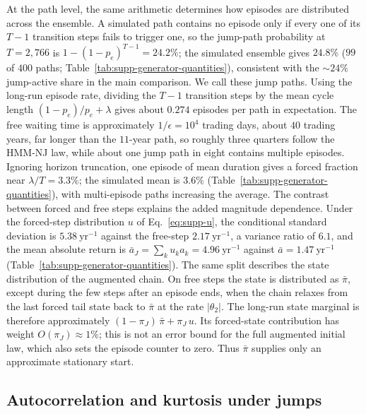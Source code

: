 At the path level, the same arithmetic determines how episodes are
distributed across the ensemble. A simulated path contains no episode
only if every one of its $T - 1$ transition steps fails to trigger
one, so the jump-path probability at $T = 2{,}766$ is
$1 - (1 - p_e)^{T-1} = 24.2\%$; the simulated ensemble
gives $24.8\%$ ($99$ of $400$ paths;
Table~\ref{tab:supp-generator-quantities}), consistent with the $\sim\!24\%$ jump-active share in the main comparison. We call these jump paths. Using the long-run episode rate, dividing the $T - 1$ transition
steps by the mean cycle length $(1 - p_e)/p_e + \lambda$ gives about $0.274$
episodes per path in expectation. The free waiting time is approximately
$1/\epsilon = 10^4$ trading days, about $40$ trading years, far
longer than the $11$-year path, so roughly three quarters follow the HMM-NJ law, while about one jump path in eight contains multiple episodes. Ignoring horizon truncation, one episode of mean duration gives a
forced fraction near $\lambda / T = 3.3\%$; the simulated mean is
$3.6\%$ (Table~\ref{tab:supp-generator-quantities}), with multi-episode paths increasing the average.
The contrast between forced and free steps explains the added magnitude dependence. Under the forced-step distribution $u$ of
Eq.~\eqref{eq:supp-u}, the conditional standard deviation is
$5.38~\mathrm{yr}^{-1}$ against the free-step $2.17~\mathrm{yr}^{-1}$,
a variance ratio of $6.1$, and the mean absolute return is
$\bar a_J = \sum_k u_k a_k = 4.96~\mathrm{yr}^{-1}$ against
$\bar a = 1.47~\mathrm{yr}^{-1}$
(Table~\ref{tab:supp-generator-quantities}). The same split describes
the state distribution of the augmented chain. On free steps the state
is distributed as $\bar\pi$, except during the few steps after an
episode ends, when the chain relaxes from the last forced tail state
back to $\bar\pi$ at the rate $|\theta_2|$. The long-run state marginal is therefore approximately $(1 - \pi_J)\,\bar\pi + \pi_J\,u$. Its forced-state contribution has weight $O(\pi_J) \approx 1\%$; this is not an error bound for the full augmented initial law, which also sets the episode counter to zero. Thus $\bar\pi$ supplies only an approximate stationary start.

\subsection{Autocorrelation and kurtosis under jumps}
\label{sec:supp-gen-tuning}

